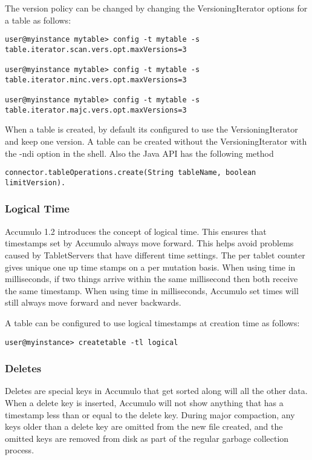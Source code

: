 The version policy can be changed by changing the VersioningIterator options for a
table as follows:

\begingroup\fontsize{8pt}{8pt}\selectfont\begin{verbatim}
user@myinstance mytable> config -t mytable -s table.iterator.scan.vers.opt.maxVersions=3

user@myinstance mytable> config -t mytable -s table.iterator.minc.vers.opt.maxVersions=3

user@myinstance mytable> config -t mytable -s table.iterator.majc.vers.opt.maxVersions=3
\end{verbatim}\endgroup

When a table is created, by default its configured to use the
VersioningIterator and keep one version. A table can be created without the
VersioningIterator with the -ndi option in the shell. Also the Java API
has the following method 

\begingroup\fontsize{8pt}{8pt}\selectfont\begin{verbatim}
connector.tableOperations.create(String tableName, boolean limitVersion).
\end{verbatim}\endgroup


\subsubsection{Logical Time}

Accumulo 1.2 introduces the concept of logical time. This ensures that timestamps
set by Accumulo always move forward. This helps avoid problems caused by
TabletServers that have different time settings. The per tablet counter gives unique
one up time stamps on a per mutation basis. When using time in milliseconds, if
two things arrive within the same millisecond then both receive the same
timestamp. When using time in milliseconds, Accumulo set times will still
always move forward and never backwards.

A table can be configured to use logical timestamps at creation time as follows:

\begingroup\fontsize{8pt}{8pt}\selectfont\begin{verbatim}
user@myinstance> createtable -tl logical
\end{verbatim}\endgroup

\subsubsection{Deletes}
Deletes are special keys in Accumulo that get sorted along will all the other data.
When a delete key is inserted, Accumulo will not show anything that has a
timestamp less than or equal to the delete key. During major compaction, any keys
older than a delete key are omitted from the new file created, and the omitted keys
are removed from disk as part of the regular garbage collection process.

